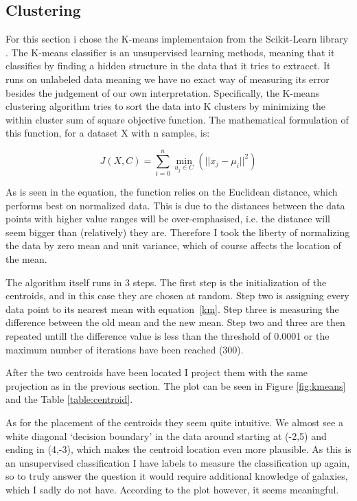 \documentclass{article}
\theoremstyle{plain}
\theoremstyle{nonumberplain}
\begin{document}
\subsection{Clustering}

For this section i chose the K-means implementaion from the Scikit-Learn library \cite{website:kmeans}. 
The K-means classifier is an unsupervised learning methods, meaning that it classifies by finding a hidden structure in the data that it tries to extracct. 
It runs on unlabeled data meaning we have no exact way of measuring its error besides the judgement of our own interpretation. 
Specifically, the K-means clustering algorithm tries to sort the data into K clusters by minimizing the within cluster sum of square objective function. 
The mathematical formulation of this function, for a dataset X with n samples, is:

\begin{equation} \label{km}
J(X,C) = \sum_{i=0}^n \min_{u_j \in C}(||x_j - \mu_i||^2)
\end{equation}

As is seen in the equation, the function relies on the Euclidean distance, which performs best on normalized data.
This is due to the distances between the data points with higher value ranges will be over-emphasised, i.e. the distance will seem bigger than (relatively) they are.
Therefore I took the liberty of normalizing the data by zero mean and unit variance, which of course affects the location of the mean. 

The algorithm itself runs in 3 steps.
The first step is the initialization of the centroids, and in this case they are chosen at random. 
Step two is assigning every data point to its nearest mean with equation~\eqref{km}. 
Step three is measuring the difference between the old mean and the new mean.
Step two and three are then repeated untill the difference value is less than the threshold of 0.0001 or the maximum number of iterations have been reached (300). 

After the two centroids have been located I project them with the same projection as in the previous section.
The plot can be seen in Figure \ref{fig:kmeans} and the Table \ref{table:centroid}. 

As for the placement of the centroids they seem quite intuitive.
We almost see a white diagonal `decision boundary' in the data around starting at (-2,5) and ending in (4,-3), which makes the centroid location even more plausible.
As this is an unsupervised classification I have labels to measure the classification up again, so to truly answer the question it would require additional knowledge of galaxies, which I sadly do not have. 
According to the plot however, it seems meaningful. 
\end{document}
